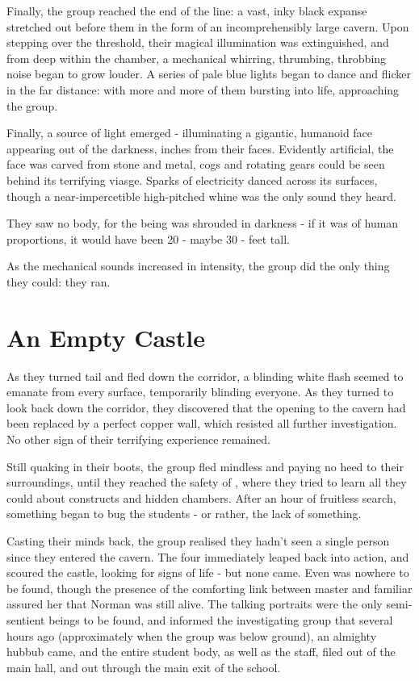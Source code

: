 \documentclass[oneside, 9pt,english]{extbook}
\begin{document}
	Finally, the group reached the end of the line: a vast, inky black expanse stretched out before them in the form of an incomprehensibly large cavern. Upon stepping over the threshold, their magical illumination was extinguished, and from deep within the chamber, a mechanical whirring, thrumbing, throbbing noise began to grow louder. A series of pale blue lights began to dance and flicker in the far distance: with more and more of them bursting into life, approaching the group.
	
	Finally, a source of light emerged - illuminating a gigantic, humanoid face appearing out of the darkness, inches from their faces. Evidently artificial, the face was carved from stone and metal, cogs and rotating gears could
be seen behind its terrifying viasge. Sparks of electricity danced across its surfaces, though a near-impercetible high-pitched whine was the only sound they heard. 

They saw no body, for the being was shrouded in darkness - if it was of human proportions, it would have been 20 - maybe 30 - feet tall. 

	As the mechanical sounds increased in intensity, the group did the only thing they could: they ran. 
	
	\section{An Empty Castle}
	As they turned tail and fled down the corridor, a blinding white flash seemed to emanate from every surface,
temporarily blinding everyone. As they turned to look back down the corridor, they discovered that the
opening to the cavern had been replaced by a perfect copper wall, which resisted all further investigation.
No other sign of their terrifying experience remained.

Still quaking in their boots, the group fled mindless and paying no heed to their surroundings, until they
reached the safety of , where they tried to learn all they could about constructs and hidden
chambers. After an hour of fruitless search, something began to bug the students - or rather, the lack of something.

Casting their minds back, the group realised they hadn’t seen a single
person since they entered the cavern. The four immediately leaped back into action, and scoured the castle,
looking for signs of life - but none came. Even  was nowhere to be found, though the presence of the comforting
link between master and familiar assured her that Norman was still alive.
The talking portraits were the only semi-sentient beings to be found, and informed the investigating group
that several hours ago (approximately when the group was below ground), an almighty hubbub came, and
the entire student body, as well as the staff, filed out of the main hall, and out through the main exit of the
school.
\end{document}

